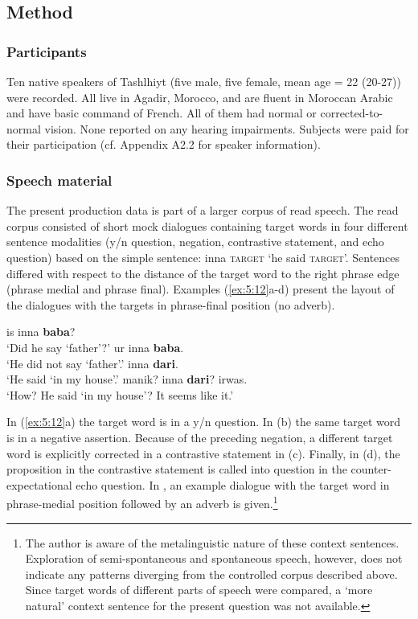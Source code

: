 \subsection{Method}
\subsubsection{Participants}
Ten native speakers of Tashlhiyt (five male, five female, mean age = 22 (20-27)) were recorded. All live in Agadir, Morocco, and are fluent in Moroccan Arabic and have basic command of French. All of them had normal or corrected-to-normal vision. None reported on any hearing impairments. Subjects were paid for their participation (cf. Appendix A2.2 for speaker information).

\subsubsection{Speech material}
The present production data is part of a larger corpus of read speech. The read corpus consisted of short mock dialogues containing target words in four different sentence modalities (y/n question, negation, contrastive statement, and echo question) based on the simple sentence: inna \textsc{target} ‘he said \textsc{target}’. Sentences differed with respect to the distance of the target word to the right phrase edge (phrase medial and phrase final). Examples (\ref{ex:5:12}a-d) present the layout of the dialogues with the targets in phrase-final position (no adverb).

\begin{exe}
\ex\label{ex:5:12} \begin{xlist}
                \ex\label{ex:5:12a} is inna \textbf{baba}? \\		
                ‘Did he say ‘father’?’	
                \ex\label{ex:5:12b} ur inna \textbf{baba}. \\ 		
                ‘He did not say ‘father’.’
                \ex\label{ex:5:12c} inna \textbf{dari}.\\ 			
                ‘He said ‘in my house’.’
                \ex\label{ex:5:12d} manik? inna \textbf{dari}? irwas. \\	
                ‘How? He said ‘in my house’? It seems like it.’
\end{xlist}
\end{exe} 

In (\ref{ex:5:12}a) the target word is in a y/n question. In (b) the same target word is in a negative assertion. Because of the preceding negation, a different target word is explicitly corrected in a contrastive statement in (c). Finally, in (d), the proposition in the contrastive statement is called into question in the counter-expectational echo question. In , an example dialogue with the target word in phrase-medial position followed by an adverb is given.\footnote{The author is aware of the metalinguistic nature of these context sentences. Exploration of semi-spontaneous and spontaneous speech, however, does not indicate any patterns diverging from the controlled corpus described above. Since target words of different parts of speech were compared, a ‘more natural’ context sentence for the present question was not available.}

